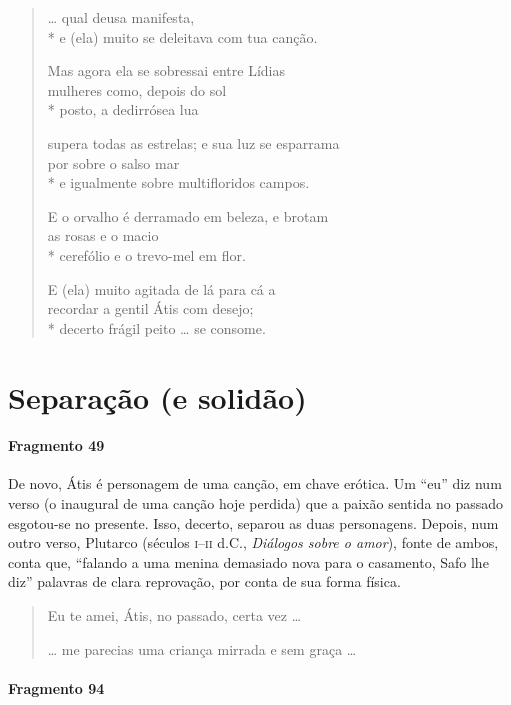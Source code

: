 \begin{verse}
\ldots{} qual deusa manifesta,\\*
e (ela) muito se deleitava com tua canção.

Mas agora ela se sobressai entre Lídias\\
mulheres como, depois do sol\\*
posto, a dedirrósea lua

supera todas as estrelas; e sua luz se esparrama\\
por sobre o salso mar \\*
e igualmente sobre multifloridos campos.

E o orvalho é derramado em beleza, e brotam\\
as rosas e o macio \\*
cerefólio e o trevo-mel em flor.

E (ela) muito agitada de lá para cá a \\
recordar a gentil Átis com desejo;\\*
decerto frágil peito \ldots{} se consome.
\end{verse}


\section{Separação (e solidão)}

\paragraph{Fragmento 49}

{\small De novo, Átis é personagem de uma canção, em chave erótica. Um “eu” diz num
verso (o inaugural de uma canção hoje perdida) que a paixão sentida no passado
esgotou-se no presente. Isso, decerto, separou as duas personagens. Depois, num
outro verso, Plutarco (séculos \textsc{i}--\textsc{ii} d.C., \textit{Diálogos sobre o amor}),
fonte de ambos, conta que, “falando a uma menina demasiado nova para o
casamento, Safo lhe diz” palavras de clara reprovação, por conta de sua forma
física. }

\begin{verse}
Eu te amei, Átis, no passado, certa vez \ldots{}

\ldots{} me parecias uma criança mirrada e sem \qb{}graça \ldots{}
\end{verse}


\paragraph{Fragmento 94}

